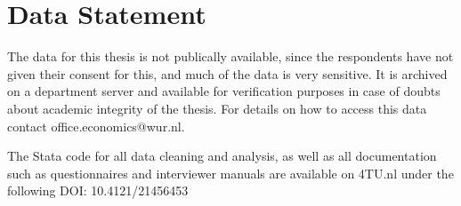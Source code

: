 \chapter*{Data Statement}
\label{chap:datastatement}

The data for this thesis is not publically available, since the respondents have not given their consent for this, and much of the data is very sensitive. It is archived on a department server and available for verification purposes in case of doubts about academic integrity of the thesis. For details on how to access this data contact office.economics@wur.nl.

The Stata code for all data cleaning and analysis, as well as all documentation such as questionnaires and interviewer manuals are available on 4TU.nl under the following DOI: 10.4121/21456453